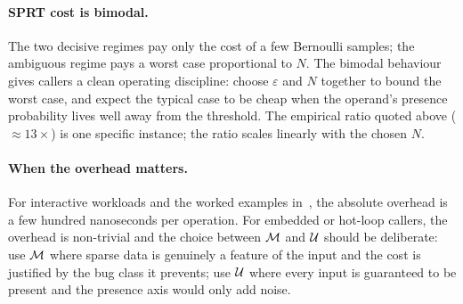 \paragraph{SPRT cost is bimodal.} The two decisive regimes pay only the
cost of a few Bernoulli samples; the ambiguous regime pays a worst case
proportional to $N$. The bimodal behaviour gives callers a clean operating
discipline: choose $\varepsilon$ and $N$ together to bound the worst case,
and expect the typical case to be cheap when the operand's presence
probability lives well away from the threshold. The empirical ratio
quoted above ($\approx 13\times$) is one specific instance; the ratio
scales linearly with the chosen $N$.

\paragraph{When the overhead matters.} For interactive workloads and the
worked examples in~, the absolute overhead is a few
hundred nanoseconds per operation. For embedded or hot-loop callers, the
overhead is non-trivial and the choice between $\mathcal{M}$ and $\mathcal{U}$
should be deliberate: use $\mathcal{M}$ where sparse data is genuinely a
feature of the input and the cost is justified by the bug class it
prevents; use $\mathcal{U}$ where every input is guaranteed to be present and
the presence axis would only add noise.
